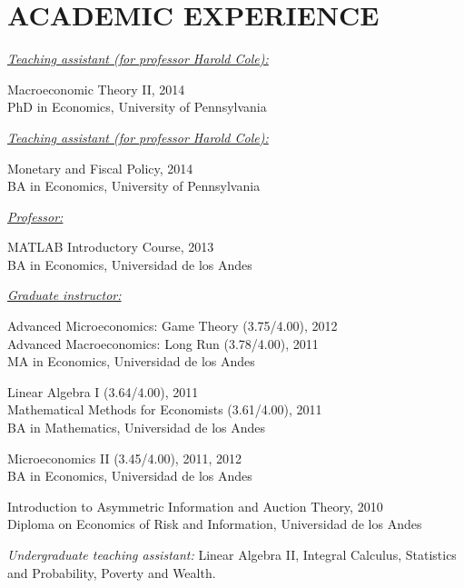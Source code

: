\documentclass{res}
\begin{document}
\begin{resume}
\begin{itemize}
								\end{itemize}
\newpage
\section{ACADEMIC EXPERIENCE} 

								\underline{{\sl Teaching assistant (for professor Harold Cole):}}
								
								Macroeconomic Theory II, \hfill 2014\\
								PhD in Economics,	University of Pennsylvania

								\underline{{\sl Teaching assistant (for professor Harold Cole):}}
								
								Monetary and Fiscal Policy, \hfill 2014\\
								BA in Economics,	University of Pennsylvania

								\underline{{\sl Professor:}}
								
								MATLAB Introductory Course, \hfill 2013\\
								BA in Economics,	Universidad de los Andes

								\underline{{\sl Graduate instructor:}}
								
								Advanced Microeconomics: Game Theory (3.75/4.00),  \hfill 2012\\
								Advanced Macroeconomics: Long Run (3.78/4.00), \hfill 2011\\
								MA in Economics,	Universidad de los Andes
								
								Linear Algebra I (3.64/4.00), \hfill 2011\\
								Mathematical Methods for Economists (3.61/4.00), \hfill 2011\\
								BA in Mathematics, Universidad de los Andes
                                
								Microeconomics II (3.45/4.00), \hfill 2011, 2012\\
								BA in Economics, Universidad de los Andes
								                
								Introduction to Asymmetric Information and Auction Theory, \hfill 2010\\
								Diploma on Economics of Risk and Information, Universidad de los Andes

								{\sl Undergraduate teaching assistant:} 
								Linear Algebra II, Integral Calculus, Statistics and Probability, Poverty and Wealth.\\


\end{resume}
\end{document}
